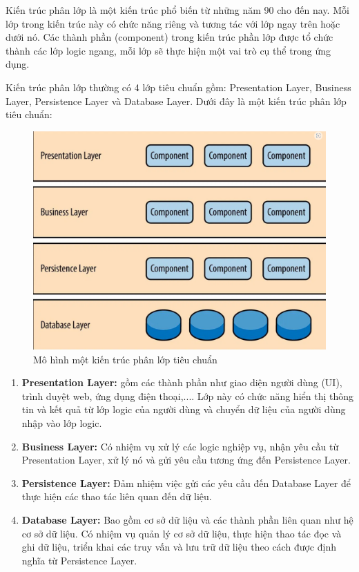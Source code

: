 Kiến trúc phân lớp là một kiến trúc phổ biến từ những năm 90 cho đến nay. Mỗi lớp trong kiến trúc này có chức năng riêng và tương tác với lớp ngay trên hoặc dưới nó. Các thành phần (component) trong kiến trúc phần lớp được tổ chức thành các lớp logic ngang, mỗi lớp sẽ thực hiện một vai trò cụ thể trong ứng dụng.

Kiến trúc phân lớp thường có 4 lớp tiêu chuẩn gồm: Presentation Layer, Business Layer, Persistence Layer và Database Layer. Dưới đây là một kiến trúc phân lớp tiêu chuẩn:

\begin{figure}[H]

	\centering
    \includegraphics[scale = 0.3]{img/Layered_Architecture.png}
    \caption{Mô hình một kiến trúc phân lớp tiêu chuẩn}

\end{figure}

\begin{enumerate}
    \item \textbf{Presentation Layer:} gồm các thành phần như giao diện người dùng (UI), trình duyệt web, ứng dụng điện thoại,.... Lớp này có chức năng hiển thị thông tin và kết quả từ lớp logic của người dùng và chuyển dữ liệu của người dùng nhập vào lớp logic.
    \item \textbf{Business Layer:} Có nhiệm vụ xử lý các logic nghiệp vụ, nhận yêu cầu từ Presentation Layer, xử lý nó và gửi yêu cầu tương ứng đến Persistence Layer.
    \item \textbf{Persistence Layer:} Đảm nhiệm việc gửi các yêu cầu đến Database Layer để thực hiện các thao tác liên quan đến dữ liệu.
    \item \textbf{Database Layer:} Bao gồm cơ sở dữ liệu và các thành phần liên quan như hệ cơ sở dữ liệu. Có nhiệm vụ quản lý cơ sở dữ liệu, thực hiện thao tác đọc và ghi dữ liệu, triển khai các truy vấn và lưu trữ dữ liệu theo cách được định nghĩa từ Persistence Layer.
\end{enumerate}


